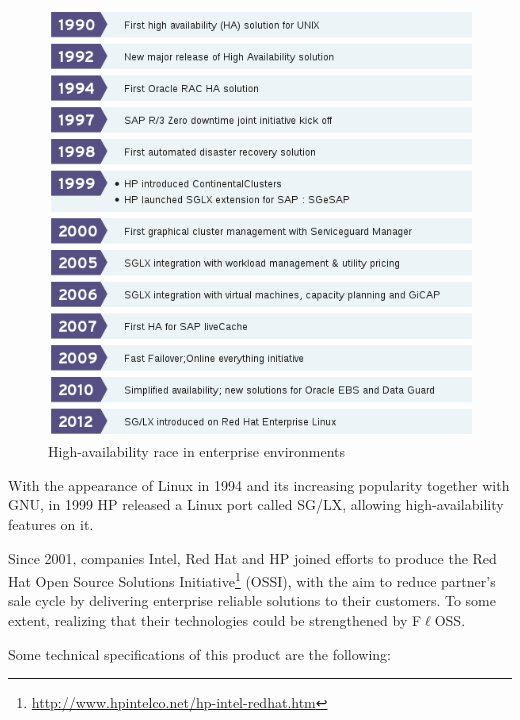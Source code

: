 \documentclass[a4paper, 12pt]{book}
\begin{document}
\begin{figure}
  \centering
  \includegraphics[scale=0.70]{commercial-ha.png}
  \caption[High-availability race in enterprise environments]{High-availability race in enterprise environments}
  \label{fig:enterprise}
\end{figure}

\noindent With the appearance of Linux in 1994 and its increasing popularity together with GNU, in 1999 HP released a Linux port called SG/LX, allowing high-availability features on it.\bigskip

\noindent Since 2001, companies Intel, Red Hat and HP joined efforts to produce the Red Hat Open Source Solutions Initiative\footnote{\url{http://www.hpintelco.net/hp-intel-redhat.htm}} (OSSI), with the aim to reduce partner's sale cycle by delivering enterprise reliable solutions to their customers. To some extent, realizing that their technologies could be strengthened by F$\ell$OSS.\bigskip

\noindent Some technical specifications of this product are the following:
\end{document}
